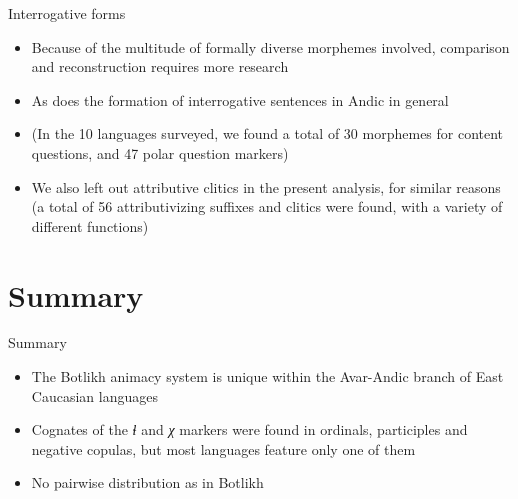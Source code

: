 \begin{frame}{Interrogative forms}

\begin{itemize}
    \item Because of the multitude of formally diverse morphemes involved, comparison and reconstruction requires more research
    \item As does the formation of interrogative sentences in Andic in general %
    \item (In the 10 languages surveyed, we found a total of 30 morphemes for content questions, and 47 polar question markers)
    \pause
    \item We also left out attributive clitics in the present analysis, for similar reasons (a total of 56 attributivizing suffixes and clitics were found, with a variety of different functions)
\end{itemize}
\end{frame}


\section{Summary}
\begin{frame}{Summary}
\begin{itemize}
    \item The Botlikh animacy system is unique within the Avar-Andic branch of East Caucasian languages
    \item Cognates of the \textit{ɬ} and \textit{χ} markers were found in ordinals, participles and negative copulas, but most languages feature only one of them
    \item No pairwise distribution as in Botlikh
\end{itemize}
\end{frame}

